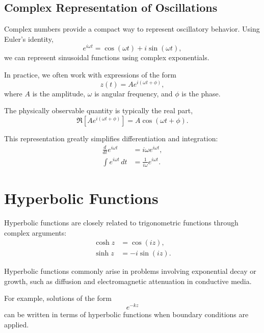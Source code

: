 \subsection{Complex Representation of Oscillations}

Complex numbers provide a compact way to represent oscillatory behavior. Using
Euler's identity,
\begin{equation}
    e^{i \omega t} = \cos(\omega t) + i \sin(\omega t),
\end{equation}
we can represent sinusoidal functions using complex exponentials.

In practice, we often work with expressions of the form
\begin{equation}
    z(t) = A e^{i(\omega t + \phi)},
\end{equation}
where $A$ is the amplitude, $\omega$ is angular frequency, and $\phi$ is the phase.

The physically observable quantity is typically the real part,
\begin{equation}
    \Re\left[ A e^{i(\omega t + \phi)} \right] = A \cos(\omega t + \phi).
\end{equation}

This representation greatly simplifies differentiation and integration:
\begin{align}
    \frac{d}{dt} e^{i \omega t} &= i \omega e^{i \omega t}, \\
    \int e^{i \omega t} \, dt &= \frac{1}{i\omega} e^{i \omega t}.
\end{align}


\section{Hyperbolic Functions}\label{apx:hyper}

Hyperbolic functions are closely related to trigonometric functions through
complex arguments:
\begin{align}
    \cosh z &= \cos(i z), \\
    \sinh z &= -i \sin(i z).
\end{align}

Hyperbolic functions commonly arise in problems involving exponential decay or
growth, such as diffusion and electromagnetic attenuation in conductive media.

For example, solutions of the form
\begin{equation}
    e^{-k z}
\end{equation}
can be written in terms of hyperbolic functions when boundary conditions are
applied.

